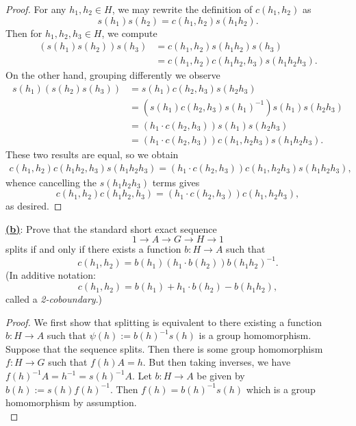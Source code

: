 \documentclass[12pt]{article}
\begin{document}
\begin{homeworkProblem}
  \begin{proof}
    For any $ h_{1},h_{2}\in H $, we may rewrite the definition of $ c(h_{1},h_{2}) $ as 
    \[
       s(h_{1})s(h_{2})= c(h_{1},h_{2}) s(h_{1}h_{2}).
    \]
    Then for $ h_{1},h_{2},h_{3}\in H $, we compute
    \begin{align*}
      (s(h_{1})s(h_{2})) s(h_{3}) &= c(h_{1},h_{2}) s(h_{1}h_{2})s(h_{3}) \\
      &= c(h_{1},h_{2}) c(h_{1}h_{2},h_{3})s(h_{1}h_{2}h_{3}).
    \end{align*}
    On the other hand, grouping differently we observe
    \begin{align*}
      s(h_{1})(s(h_{2})s(h_{3}))  &= s(h_{1}) c(h_{2},h_{3})s(h_{2}h_{3})\\ 
      &= (s(h_{1}) c(h_{2},h_{3})s(h_{1})^{-1})s(h_{1})s(h_{2}h_{3})\\
      &=  (h_{1}\cdot c(h_{2},h_{3}))s(h_{1})s(h_{2}h_{3})\\
      &=  (h_{1}\cdot c(h_{2},h_{3}))c(h_{1},h_{2}h_{3})s(h_{1}h_{2}h_{3}).
    \end{align*}
    These two results are equal, so we obtain
    \begin{align*}
     c(h_{1},h_{2}) c(h_{1}h_{2},h_{3})s(h_{1}h_{2}h_{3}) =(h_{1}\cdot c(h_{2},h_{3}))c(h_{1},h_{2}h_{3})s(h_{1}h_{2}h_{3}),
    \end{align*}
    whence cancelling the $ s(h_{1}h_{2}h_{3}) $ terms gives
    \[
      c(h_{1},h_{2}) c(h_{1}h_{2},h_{3}) = (h_{1}\cdot c(h_{2},h_{3}))c(h_{1},h_{2}h_{3}),
    \]
    as desired.
  \end{proof}

  \underline{\textbf{(b)}}: Prove that the standard short exact sequence
  \[
    1 \to A \to G \to H \to 1
  \]
  splits if and only if there exists a function $b : H \to A$ such that
  \[
    c(h_1, h_2) = b(h_1)(h_1 \cdot b(h_2))b(h_1h_2)^{-1}.
  \]
  (In additive notation:
  \[
    c(h_1, h_2) = b(h_1) + h_1 \cdot b(h_2) - b(h_1h_2),
  \]
  called a \emph{2-coboundary}.)\\

  \begin{proof}
    We first show that splitting is equivalent to there existing a function $ b:H\to A $ such that $ \psi(h):=b(h)^{-1}s(h) $ is a group homomorphism.\\

    Suppose that the sequence splits. Then there is some group homomorphism $ f:H\to G $ such that $ f(h)A = h $. But then taking inverses, we have $ f(h)^{-1}A = h^{-1} = s(h)^{-1} A $. Let $ b:H\to A $ be given by $b(h):= s(h)f(h)^{-1} $. Then $ f(h) = b(h)^{-1}s(h) $ which is a group homomorphism by assumption.\\


\end{proof}
\end{homeworkProblem}
\end{document}
